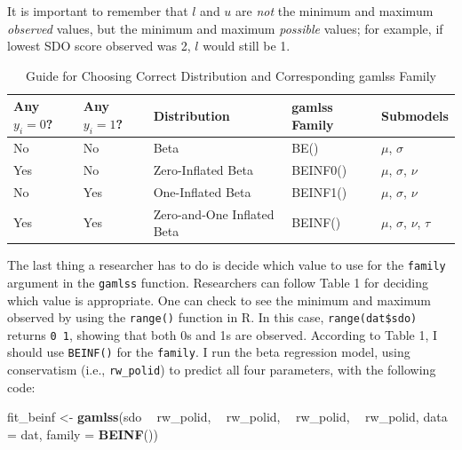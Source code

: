 \documentclass[english,man]{apa6}
\newenvironment{Shaded}{\begin{snugshade}}{\end{snugshade}}
\newcommand{\KeywordTok}[1]{\textcolor[rgb]{0.13,0.29,0.53}{\textbf{#1}}}
\newcommand{\DataTypeTok}[1]{\textcolor[rgb]{0.13,0.29,0.53}{#1}}
\newcommand{\StringTok}[1]{\textcolor[rgb]{0.31,0.60,0.02}{#1}}
\newcommand{\OperatorTok}[1]{\textcolor[rgb]{0.81,0.36,0.00}{\textbf{#1}}}
\newcommand{\NormalTok}[1]{#1}
\theoremstyle{definition}
\theoremstyle{definition}
\theoremstyle{remark}
\begin{document}
It is important to remember that \(l\) and \(u\) are \emph{not} the
minimum and maximum \emph{observed} values, but the minimum and maximum
\emph{possible} values; for example, if lowest SDO score observed was 2,
\(l\) would still be 1.

\begin{table}[tbp]
\begin{center}
\begin{threeparttable}
\caption{\label{tab:unnamed-chunk-14}Guide for Choosing Correct Distribution and Corresponding gamlss Family}
\begin{tabular}{lllll}
\toprule
Any $y_i = 0$? & Any $y_i = 1$? & Distribution & gamlss Family & Submodels\\
\midrule
No & No & Beta & BE() & $\mu$, $\sigma$\\
Yes & No & Zero-Inflated Beta & BEINF0() & $\mu$, $\sigma$, $\nu$\\
No & Yes & One-Inflated Beta & BEINF1() & $\mu$, $\sigma$, $\nu$\\
Yes & Yes & Zero-and-One Inflated Beta & BEINF() & $\mu$, $\sigma$, $\nu$, $\tau$\\
\bottomrule
\end{tabular}
\end{threeparttable}
\end{center}
\end{table}

The last thing a researcher has to do is decide which value to use for
the \texttt{family} argument in the \texttt{gamlss} function.
Researchers can follow Table 1 for deciding which value is appropriate.
One can check to see the minimum and maximum observed by using the
\texttt{range()} function in R. In this case, \texttt{range(dat\$sdo)}
returns \texttt{0\ 1}, showing that both 0s and 1s are observed.
According to Table 1, I should use \texttt{BEINF()} for the
\texttt{family}. I run the beta regression model, using conservatism
(i.e., \texttt{rw\_polid}) to predict all four parameters, with the
following code:

\begin{Shaded}
\begin{Highlighting}[]
\NormalTok{fit_beinf <-}\StringTok{ }\KeywordTok{gamlss}\NormalTok{(sdo }\OperatorTok{~}\StringTok{ }\NormalTok{rw_polid, }\OperatorTok{~}\StringTok{ }\NormalTok{rw_polid, }\OperatorTok{~}\StringTok{ }\NormalTok{rw_polid, }\OperatorTok{~}\StringTok{ }\NormalTok{rw_polid,}
                    \DataTypeTok{data =}\NormalTok{ dat, }\DataTypeTok{family =} \KeywordTok{BEINF}\NormalTok{())}
\end{Highlighting}
\end{Shaded}
\end{document}
